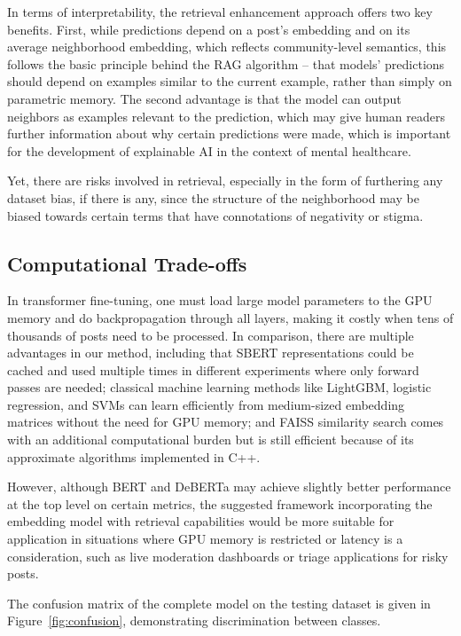 \documentclass[11pt]{article}
\begin{document}
In terms of interpretability, the retrieval enhancement approach offers two key benefits. First, while predictions depend on a post’s embedding and on its average neighborhood embedding, which reflects community-level semantics, this follows the basic principle behind the RAG algorithm – that models’ predictions should depend on examples similar to the current example, rather than simply on parametric memory. The second advantage is that the model can output neighbors as examples relevant to the prediction, which may give human readers further information about why certain predictions were made, which is important for the development of explainable AI in the context of mental healthcare.

Yet, there are risks involved in retrieval, especially in the form of furthering any dataset bias, if there is any, since the structure of the neighborhood may be biased towards certain terms that have connotations of negativity or stigma.

\subsection{Computational Trade-offs}

In transformer fine-tuning, one must load large model parameters to the GPU memory and do backpropagation through all layers, making it costly when tens of thousands of posts need to be processed. In comparison, there are multiple advantages in our method, including that SBERT representations could be cached and used multiple times in different experiments where only forward passes are needed; classical machine learning methods like LightGBM, logistic regression, and SVMs can learn efficiently from medium-sized embedding matrices without the need for GPU memory; and FAISS similarity search comes with an additional computational burden but is still efficient because of its approximate algorithms implemented in C++.

However, although BERT and DeBERTa may achieve slightly better performance at the top level on certain metrics, the suggested framework incorporating the embedding model with retrieval capabilities would be more suitable for application in situations where GPU memory is restricted or latency is a consideration, such as live moderation dashboards or triage applications for risky posts.

The confusion matrix of the complete model on the testing dataset is given in Figure~\ref{fig:confusion}, demonstrating discrimination between classes.
\end{document}
